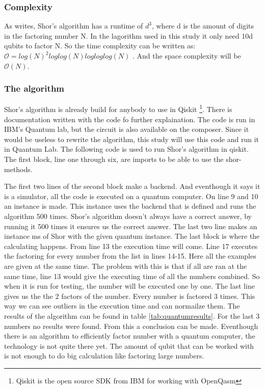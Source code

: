 \subsubsection{Complexity}
As \textcite{shor_algo} writes, Shor's algorithm has a runtime of $d^3$, where d is the amount of digits in the factoring number N. In the lagorithm used in this study it only need 10d qubits to factor N.
So the time complexity can be written as: $\mathcal{O} = log(N)^2log log(N) log log log(N)$ \autocite{shor_comp}. And the space complexity will be $\mathcal{O}(N)$.
\subsubsection{The algorithm}
Shor's algorithm is already build for anybody to use in Qiskit \footnote{Qiskit is the open source SDK from IBM for working with OpenQasm}. There is documentation written with the code fo further explaination.
The code is run in IBM's Quantum lab, but the circuit is also available on the composer. Since it would be useless to rewrite the algorithm, this study will use this code and run it in Quantum Lab.
The following code is used to run Shor's algorithm in qiskit. The first block, line one through six, are imports to be able to use the shor-methods.

The first two lines of the second block make a backend. And eventhough it says it is a simulator, all the code is executed on a quantum computer.
On line 9 and 10 an instance is made. This instance uses the backend that is defined and runs the algorithm 500 times. Shor's algorithm doesn't always have a correct answer, by running it 500 times it ensures us the correct answer.
The last two line makes an instance ms of Shor with the given quantum instance.
The last block is where the calculating happens.
From line 13 the execution time will come.
Line 17 executes the factoring for every number from the list in lines 14-15. Here all the examples are given at the same time. The problem with this is that if all are ran at the same time, line 13 would give the executing time of all the numbers combined.
So when it is run for testing, the number will be executed one by one.
The last line gives us the the 2 factors of the number.
Every number is factored 3 times. This way we can see outliers in the execution time and can normailze them.
The results of the algorithm can be found in table \ref{tab:quantumresults}. For the last 3 numbers no results were found. 
From this a conclusion can be made. Eventhough there is an algorithm to efficiently factor number with a quantum computer, the technology is not quite there yet.
The amount of qubit that can be worked with is not enough to do big calculation like factoring large numbers.


